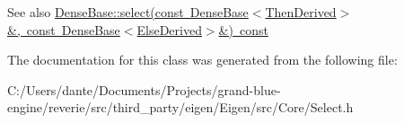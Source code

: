 \begin{DoxySeeAlso}{See also}
\mbox{\hyperlink{class_eigen_1_1_dense_base_a65e78cfcbc9852e6923bebff4323ddca}{Dense\+Base\+::select(const Dense\+Base$<$\+Then\+Derived$>$\&, const Dense\+Base$<$\+Else\+Derived$>$\&) const}} 
\end{DoxySeeAlso}


The documentation for this class was generated from the following file\+:\begin{DoxyCompactItemize}
\item 
C\+:/\+Users/dante/\+Documents/\+Projects/grand-\/blue-\/engine/reverie/src/third\+\_\+party/eigen/\+Eigen/src/\+Core/Select.\+h\end{DoxyCompactItemize}
